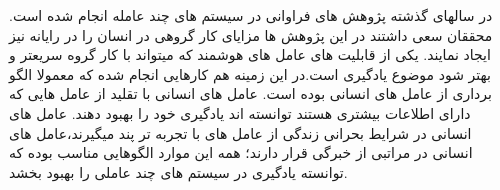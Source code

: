 در سالهای گذشته پژوهش های فراوانی در سیستم های چند عامله انجام شده است. محققان سعی داشتند در این پژوهش ها مزایای کار گروهی در انسان را در رایانه نیز ایجاد نمایند. یکی از قابلیت های عامل های هوشمند که میتواند با کار گروه سریعتر و بهتر شود موضوع یادگیری است.در این زمینه هم کارهایی انجام شده که معمولا الگو برداری از عامل های انسانی بوده است.
عامل های انسانی با تقلید از عامل هایی که دارای اطلاعات بیشتری هستند توانسته اند یادگیری خود را بهبود دهند. عامل های انسانی در شرایط بحرانی زندگی از عامل های با تجربه تر پند میگیرند،عامل های انسانی در مراتبی از خبرگی قرار دارند؛ همه این موارد الگوهایی مناسب بوده که توانسته یادگیری در سیستم های چند عاملی را بهبود بخشد.
